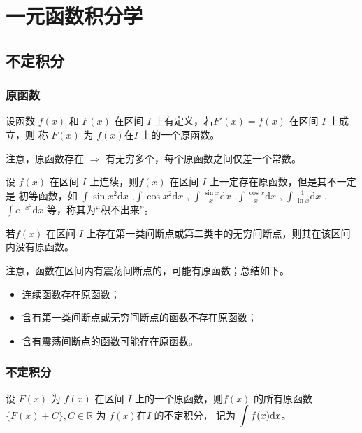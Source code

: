 \chapter{一元函数积分学}

\section{不定积分}

\subsection{原函数}

\begin{Def}[原函数]

    设函数 $ f(x) $ 和 $ F(x) $ 在区间 $ I $ 上有定义，若$ F'(x) = f(x) $ 在区间 $ I $ 上成立，则
    称 $ F(x) $ 为 $ f(x) $在$ I $ 上的一个原函数。
\end{Def}

注意，原函数存在 $ \Rightarrow $ 有无穷多个，每个原函数之间仅差一个常数。

设 $ f(x) $ 在区间 $ I $ 上连续，则$ f(x) $ 在区间 $ I $ 上一定存在原函数，但是其不一定是
初等函数，如 $ \int \sin x^2 \mathrm{d}x $ ,$ \int \cos x^2 \mathrm{d}x $ ,
$ \int \frac{\sin x}{x} \mathrm{d}x $ ,$ \int \frac{\cos x}{x} \mathrm{d}x $ ,
$ \int \frac{1}{\ln x} \mathrm{d}x $ , $ \int e^{-x^2} \mathrm{d}x $ 等，称其为“积不出来”。

若$ f(x) $ 在区间 $ I $ 上存在第一类间断点或第二类中的无穷间断点，则其在该区间内没有原函数。

注意，函数在区间内有震荡间断点的，可能有原函数；总结如下。

\begin{Theo}[原函数存在定理]

    \begin{itemize}
        \item 连续函数存在原函数；
        \item 含有第一类间断点或无穷间断点的函数不存在原函数；
        \item 含有震荡间断点的函数可能存在原函数。
    \end{itemize}    
\end{Theo}

\subsection{不定积分}

\begin{Def}[不定积分]

    设 $ F(x) $ 为 $ f(x) $ 在区间 $ I $ 上的一个原函数，则$ f(x) $ 
    的所有原函数 $ \{F(x)+C\},C\in \mathbb{R} $ 为 $ f(x) $在$ I $ 的不定积分，
    记为 $\displaystyle \int f(x) \mathrm{d}x$。
\end{Def}

